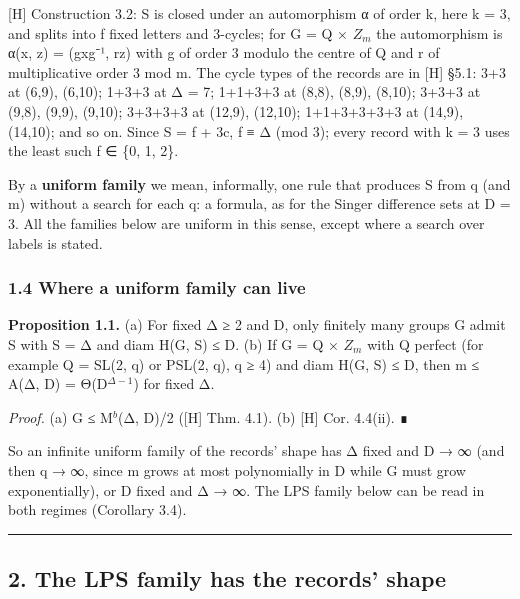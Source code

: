 \documentclass[
  10pt,
]{article}
\begin{document}
{[}H{]} Construction 3.2: S is closed under an automorphism α of order
k, here k = 3, and splits into f fixed letters and 3-cycles; for G = Q ×
\(Z_{m}\) the automorphism is α(x, z) = (gxg⁻¹, rz) with g of order 3
modulo the centre of Q and r of multiplicative order 3 mod m. The cycle
types of the records are in {[}H{]} §5.1: 3+3 at (6,9), (6,10); 1+3+3 at
Δ = 7; 1+1+3+3 at (8,8), (8,9), (8,10); 3+3+3 at (9,8), (9,9), (9,10);
3+3+3+3 at (12,9), (12,10); 1+1+3+3+3+3 at (14,9), (14,10); and so on.
Since \textbar S\textbar{} = f + 3c, f ≡ Δ (mod 3); every record with k
= 3 uses the least such f ∈ \{0, 1, 2\}.

By a \textbf{uniform family} we mean, informally, one rule that produces
S from q (and m) without a search for each q: a formula, as for the
Singer difference sets at D = 3. All the families below are uniform in
this sense, except where a search over labels is stated.

\hypertarget{where-a-uniform-family-can-live}{%
\subsubsection{1.4 Where a uniform family can
live}\label{where-a-uniform-family-can-live}}

\textbf{Proposition 1.1.} (a) For fixed Δ ≥ 2 and D, only finitely many
groups G admit S with \textbar S\textbar{} = Δ and diam H(G, S) ≤ D. (b)
If G = Q × \(Z_{m}\) with Q perfect (for example Q = SL(2, q) or PSL(2,
q), q ≥ 4) and diam H(G, S) ≤ D, then m ≤ A(Δ, D) = Θ(D\(^{Δ−1}\)) for
fixed Δ.

\emph{Proof.} (a) \textbar G\textbar{} ≤ M\(^{b}\)(Δ, D)/2 ({[}H{]} Thm.
4.1). (b) {[}H{]} Cor. 4.4(ii). ∎

So an infinite uniform family of the records' shape has Δ fixed and D →
∞ (and then q → ∞, since m grows at most polynomially in D while
\textbar G\textbar{} must grow exponentially), or D fixed and Δ → ∞. The
LPS family below can be read in both regimes (Corollary 3.4).

\begin{center}\rule{0.5\linewidth}{0.5pt}\end{center}

\hypertarget{the-lps-family-has-the-records-shape}{%
\subsection{2. The LPS family has the records'
shape}\label{the-lps-family-has-the-records-shape}}
\end{document}
